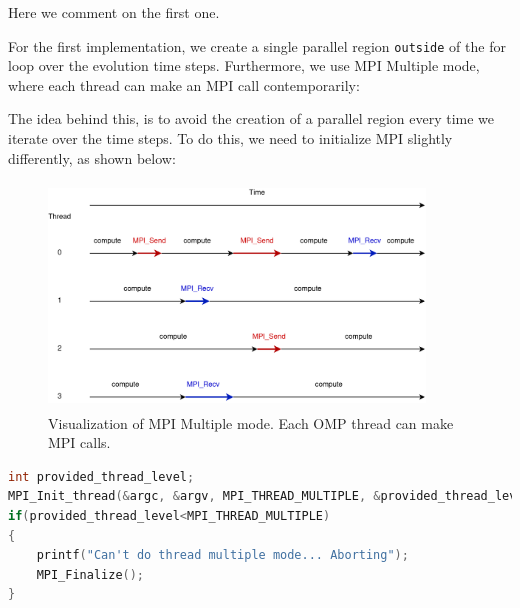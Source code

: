 \documentclass{report}
\begin{document}
Here we comment on the first one.

For the first implementation, we create a single parallel region \texttt{outside} 
of the for loop over the evolution time steps. Furthermore, we use MPI Multiple 
mode, where each thread can make an MPI call contemporarily:

The idea behind this, is to avoid the creation of a parallel region every time 
we iterate over the time steps. To do this, we need to initialize MPI slightly 
differently, as shown below:

\begin{figure}[H]
\centering
\includegraphics[width=10cm, height=6cm]{./other_images/mpi_multiple.png}
\caption{\label{fig:mpi_multiple} Visualization of MPI Multiple mode. Each OMP 
thread can make MPI calls.}
\end{figure}

\begin{lstlisting}[language=C++]
int provided_thread_level;
MPI_Init_thread(&argc, &argv, MPI_THREAD_MULTIPLE, &provided_thread_level);
if(provided_thread_level<MPI_THREAD_MULTIPLE)
{
    printf("Can't do thread multiple mode... Aborting");
    MPI_Finalize();
}
\end{lstlisting}
\end{document}
